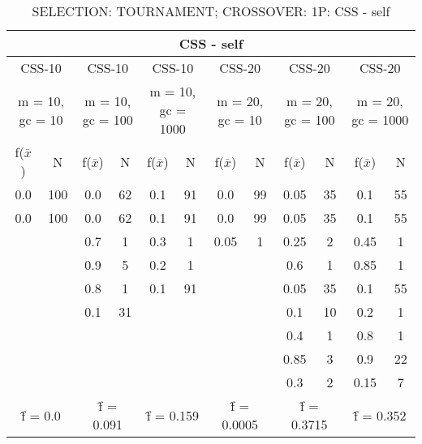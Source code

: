 \begin{table}[H]
	\centering
	\caption{SELECTION: TOURNAMENT; CROSSOVER: 1P: CSS - self}
	\begin{adjustbox}{width=1\textwidth}
		\begin{tabular}{ |c|c||c|c||c|c||c|c||c|c||c|c| }
			\hline
			\multicolumn{12}{|c|}{CSS - self} \\
			\hline
			\multicolumn{2}{|c||}{CSS-10} & \multicolumn{2}{c||}{CSS-10} & \multicolumn{2}{c||}{CSS-10} & \multicolumn{2}{c||}{CSS-20} & \multicolumn{2}{c||}{CSS-20} & \multicolumn{2}{c|}{CSS-20}\\
			\hline
			\multicolumn{2}{|c||}{m = 10, gc = 10} & \multicolumn{2}{c||}{m = 10, gc = 100} & \multicolumn{2}{c||}{m = 10, gc = 1000} & \multicolumn{2}{c||}{m = 20, gc = 10} & \multicolumn{2}{c||}{m = 20, gc = 100} & \multicolumn{2}{c|}{m = 20, gc = 1000}\\
			\hline
			f($\bar{x}$) & N & f($\bar{x}$) & N & f($\bar{x}$) & N & f($\bar{x}$) & N & f($\bar{x}$) & N & f($\bar{x}$) & N\\
			\hline
			\hline
			0.0 & 100 & 0.0 & 62 & 0.1 & 91 & 0.0 & 99 & 0.05 & 35 & 0.1 & 55\\
			\hline
			0.0 & 100 & 0.0 & 62 & 0.1 & 91 & 0.0 & 99 & 0.05 & 35 & 0.1 & 55\\
			&   & 0.7 & 1 & 0.3 & 1 & 0.05 & 1 & 0.25 & 2 & 0.45 & 1\\
			&   & 0.9 & 5 & 0.2 & 1 &   &   & 0.6 & 1 & 0.85 & 1\\
			&   & 0.8 & 1 & 0.1 & 91 &   &   & 0.05 & 35 & 0.1 & 55\\
			&   & 0.1 & 31 &   &   &   &   & 0.1 & 10 & 0.2 & 1\\
			&   &   &   &   &   &   &   & 0.4 & 1 & 0.8 & 1\\
			&   &   &   &   &   &   &   & 0.85 & 3 & 0.9 & 22\\
			&   &   &   &   &   &   &   & 0.3 & 2 & 0.15 & 7\\
			\hline
			\multicolumn{2}{|c||}{\^{f} = 0.0} & \multicolumn{2}{c||}{\^{f} = 0.091} & \multicolumn{2}{c||}{\^{f} = 0.159} & \multicolumn{2}{c||}{\^{f} = 0.0005} & \multicolumn{2}{c||}{\^{f} = 0.3715} & \multicolumn{2}{c|}{\^{f} = 0.352}\\
			\hline
		\end{tabular}
	\end{adjustbox}
\end{table}
